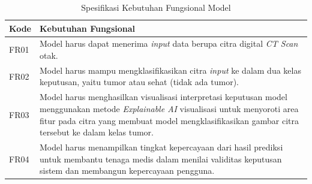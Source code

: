 \begin{table}[H]
	\centering
	\caption{Spesifikasi Kebutuhan Fungsional Model}
	\label{tab:kebutuhan_fungsional}
	\begin{tabular}{|l|p{11cm}|}
		\hline
		\textbf{Kode} & \textbf{Kebutuhan Fungsional} \\ \hline
		FR01 & Model harus dapat menerima \textit{input} data berupa citra digital \textit{CT Scan} otak. \\ \hline
		FR02 & Model harus mampu mengklasifikasikan citra \textit{input} ke dalam dua kelas keputusan, yaitu tumor atau sehat (tidak ada tumor). \\ \hline
		FR03 & Model harus menghasilkan visualisasi interpretasi keputusan model menggunakan metode \textit{Explainable AI} visualisasi untuk menyoroti area fitur pada citra yang membuat model mengklasifikasikan gambar citra tersebut ke dalam kelas tumor. \\ \hline
		FR04 & Model harus menampilkan tingkat kepercayaan dari hasil prediksi untuk membantu tenaga medis dalam menilai validitas keputusan sistem dan membangun kepercayaan pengguna. \\ \hline
	\end{tabular}
\end{table}